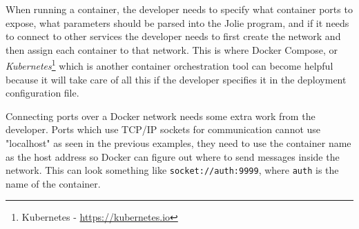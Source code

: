 When running a container, the developer needs to specify what container ports to expose, what parameters should be parsed into the Jolie program, and if it needs to connect to other services the developer needs to first create the network and then assign each container to that network.
This is where Docker Compose, or \emph{Kubernetes}\footnote{Kubernetes - \url{https://kubernetes.io}} which is another container orchestration tool can become helpful because it will take care of all this if the developer specifies it in the deployment configuration file.

Connecting ports over a Docker network needs some extra work from the developer. Ports which use TCP/IP sockets for communication cannot use "localhost" as seen in the previous examples, they need to use the container name as the host address so Docker can figure out where to send messages inside the network.
This can look something like \texttt{socket://auth:9999}, where \texttt{auth} is the name of the container.

